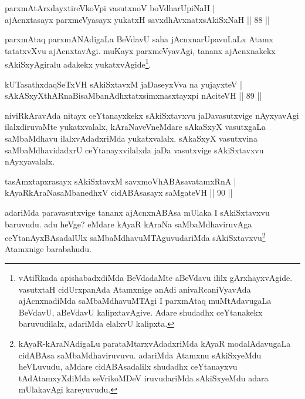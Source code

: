 \begin{shl}
parxmAtArxdayxtireVkoV\s pi vasutxnoV boVdharUpiNaH |\\
ajAcnxtasayx parxmeVyasayx yukatxH savxdhAvxnatxsAkiSxNaH \hfill || 88 ||
\end{shl}

\begin{artha}%
parxmAtaq parxmANAdigaLa BeVdavU saha jAcnxnarUpavuLaLx Atamx tatatxvXvu ajAcnxtavAgi. muKayx parxmeVyavAgi, tananx ajAcnxnakekx sAkiSxyAgiralu adakekx yukatxvAgide\footnote{vAtiRkada apishabadxdiMda BeVdadaMte aBeVdavu ililx gArxhayxvAgide. vasutxtaH cidUrxpanAda Atamxnige anAdi anivaRcaniVyavAda ajAcnxnadiMda saMbaMdhavuMTAgi I parxmAtaq muMtAdavugaLa BeVdavU, aBeVdavU kalipxtavAgive. Adare shudadhx ceYtanakekx baruvudilalx, adariMda elalxvU kalipxta.}.
\end{artha}


\begin{shl}
kUTasathxdaqSeTxVH sAkiSxtavxM jaDaseyxVva na yujayxteV |\\
sAkASxyXthARnaBisaMbanAdhxtatxsimxnasxtayxpi nAciteVH \hfill || 89 ||
\end{shl}

\begin{artha}
niviRkAravAda nitayx ceYtanayxkekx sAkiSxtavxvu jaDavasutxvige nAyxyavAgi ilalxdiruvaMte yukatxvalalx, kAraNaveVneMdare sAkaSxyX vasutxgaLa saMbaMdhavu ilalxvAdadxriMda yukatxvalalx. sAkaSxyX vasutxvina saMbaMdhavidadxrU ceYtanayxvilalxda jaDa vasutxvige sAkiSxtavxvu nAyxyavalalx.
\end{artha}


\begin{shl}
tasAmxtapxrasayx sAkiSxtavxM savxmoVhABAsavatamxRnA |\\
kAyaRkAraNasaMbanedhxV cidABAsasayx saMgateVH \hfill || 90 ||
\end{shl}

\begin{artha}
adariMda paravasutxvige tananx ajAcnxnABAsa mUlaka I sAkiSxtavxvu baruvudu. adu heVge? eMdare kAyaR kAraNa saMbaMdhaviruvAga ceYtanAyxBAsadalUlx saMbaMdhavuMTAguvudariMda sAkiSxtavxvu\footnote{kAyaR-kAraNAdigaLu parataMtarxvAdadxriMda kAyaR modalAdavugaLa cidABAsa saMbaMdhaviruvuvu. adariMda Atamxnu sAkiSxyeMdu heVLuvudu, aMdare cidABAsadalilx shudadhx ceYtanayxvu tAdAtamxyXdiMda seVrikoMDeV iruvudariMda sAkiSxyeMdu adara mUlakavAgi kareyuvudu.} Atamxnige barabahudu.
\end{artha}

